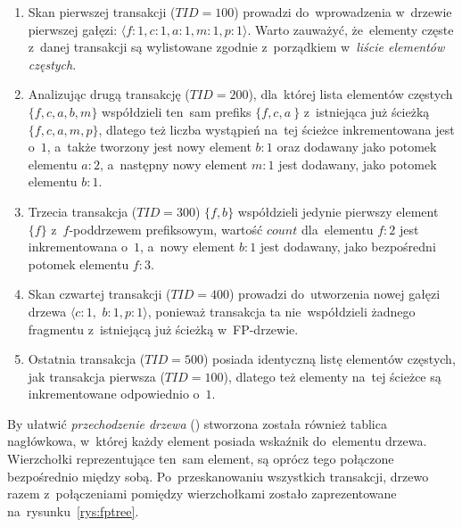 \begin{enumerate}
	\item Skan pierwszej transakcji ($TID = 100$) prowadzi do~wprowadzenia w~drzewie pierwszej gałęzi: $\langle f: 1, c: 1, a: 1, m: 1, p: 1\rangle$. Warto zauważyć, że~elementy częste z~danej transakcji są wylistowane zgodnie z~porządkiem w~\emph{liście elementów częstych}.
	\item Analizując drugą transakcję ($TID = 200$), dla~której lista elementów częstych $\lbrace f, c, a, b, m \rbrace$ współdzieli ten~sam prefiks $\lbrace f, c, a~\rbrace$ z~istniejąca już ścieżką $\lbrace f, c, a, m, p \rbrace$, dlatego też liczba wystąpień na~tej ścieżce inkrementowana jest o~$1$, a~także tworzony jest nowy element $b: 1$ oraz dodawany jako potomek elementu $a: 2$, a~następny nowy element $m: 1$ jest dodawany, jako potomek elementu $b: 1$.
	\item Trzecia transakcja ($TID = 300$) $\lbrace f, b \rbrace$ współdzieli jedynie pierwszy element $\lbrace f \rbrace$ z~$f$-poddrzewem prefiksowym, wartość $count$ dla~elementu $f: 2$ jest inkrementowana o~$1$, a~nowy element $b: 1$ jest dodawany, jako bezpośredni potomek elementu $f: 3$.
	\item Skan czwartej transakcji ($TID = 400$) prowadzi do~utworzenia nowej gałęzi drzewa $\langle c: 1,$ $b: 1, p: 1\rangle$, ponieważ transakcja ta nie~współdzieli żadnego fragmentu z~istniejącą już ścieżką w~FP-drzewie.
	\item Ostatnia transakcja ($TID = 500$) posiada identyczną listę elementów częstych, jak transakcja pierwsza ($TID = 100$), dlatego też elementy na~tej ścieżce są inkrementowane odpowiednio o~$1$.
\end{enumerate}

By ułatwić \emph{przechodzenie drzewa} () stworzona została również tablica nagłówkowa, w~której każdy element posiada wskaźnik do~elementu drzewa. Wierzchołki reprezentujące ten~sam element, są oprócz tego połączone bezpośrednio między sobą. Po~przeskanowaniu wszystkich transakcji, drzewo razem z~połączeniami pomiędzy wierzchołkami zostało zaprezentowane na~rysunku~\ref{rys:fptree}.

